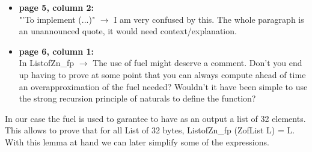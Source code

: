 \begin{itemize}
  \item \textbf{page 5, column 2:}\\
    "'To implement (...)" $\rightarrow$ I am very confused by this. The whole paragraph is an unannounced quote, it would need context/explanation.
\end{itemize}
\begin{answer}
\end{answer}

\begin{itemize}
  \item \textbf{page 6, column 1:}\\
    In ListofZn\_fp $\rightarrow$ The use of fuel might deserve a comment. Don't you end up having to prove at some point that you can always compute ahead of time an overapproximation of the fuel needed? Wouldn't it have been simple to use the strong recursion principle of naturals to define the function?
\end{itemize}
    \begin{answer}
      In our case the fuel is used to garantee to have as an output a list of 32 elements. This allows to prove that for all List of 32 bytes, ListofZn\_fp (ZofList L) = L. With this lemma at hand we can later simplify some of the expressions.
    \end{answer}

